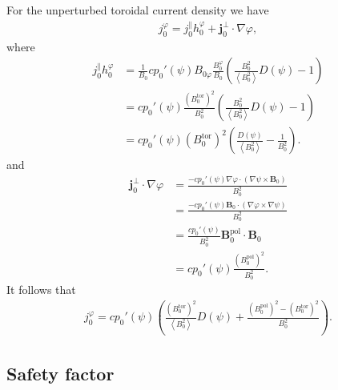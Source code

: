 \documentclass[a4paper, 10pt, english]{article}
\let\temp\varrho
\let\varrho\rho
\let\rho\temp
\let\temp\vartheta
\let\vartheta\theta
\let\theta\temp
\let\temp\varphi
\let\varphi\phi
\let\phi\temp
\let\vec\symbf
\newcommand*\pol{\ensuremath{\textrm{pol}}}  %
\newcommand*\tor{\ensuremath{\textrm{tor}}}  %
\begin{document}
For the unperturbed toroidal current density we have
\begin{gather}
  j_{0}^{\phi} = j_{0}^{\parallel} h_{0}^{\phi} + \vec{j}_{0}^{\perp} \cdot \nabla \phi,
\end{gather}
where
\begin{align}
  j_{0}^{\parallel} h_{0}^{\phi} &= \frac{1}{B_{0}} c p_{0}'(\psi) B_{0 \phi} \frac{B_{0}^{\phi}}{B_{0}} \left( \frac{B_{0}^{2}}{\left\langle B_{0}^{2} \right\rangle} D(\psi) - 1 \right) \nonumber \\
  &= c p_{0}'(\psi) \frac{\left( B_{0}^{\tor} \right)^{2}}{B_0^2} \left( \frac{B_{0}^{2}}{\left\langle B_{0}^{2} \right\rangle} D(\psi) - 1 \right) \nonumber \\
  &= c p_{0}'(\psi) \left( B_{0}^{\tor} \right)^{2} \left( \frac{D(\psi)}{\left\langle B_{0}^{2} \right\rangle} - \frac{1}{B_{0}^{2}} \right).
\end{align}
and
\begin{align}
  \vec{j}_{0}^{\perp} \cdot \nabla \phi &= \frac{-c p_{0}'(\psi) \nabla \phi \cdot (\nabla \psi \times \vec{B}_{0})}{B_{0}^{2}} \nonumber \\
  &= \frac{-c p_{0}'(\psi) \vec{B}_{0} \cdot (\nabla \phi \times \nabla \psi)}{B_{0}^{2}} \\
  &= \frac{c p_{0}'(\psi)}{B_{0}^{2}} \vec{B}_{0}^{\pol} \cdot \vec{B}_{0} \nonumber \\
  &= c p_{0}'(\psi) \frac{\left( B_{0}^{\pol} \right)^{2}}{B_{0}^{2}}.
\end{align}
It follows that
\begin{gather}
  j_{0}^{\phi} = c p_{0}'(\psi) \left( \frac{\left( B_{0}^{\tor} \right)^{2}}{\left\langle B_{0}^{2} \right\rangle} D(\psi) + \frac{\left( B_{0}^{\pol} \right)^2 - \left( B_{0}^{\tor} \right)^2}{B_{0}^{2}} \right).
\end{gather}

\subsection{Safety factor}
\label{sec:safety_factor}
\end{document}
